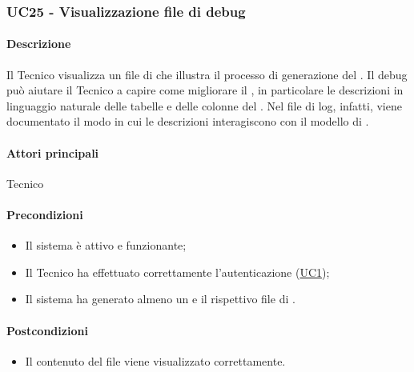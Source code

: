 \subsubsection{UC25 - Visualizzazione file di debug}\label{UC25}
\paragraph*{Descrizione}
Il Tecnico visualizza un file di  che illustra il processo di generazione del . Il debug può aiutare il Tecnico a capire come migliorare il , in particolare le descrizioni in linguaggio naturale delle tabelle e delle colonne del . Nel file di log, infatti, viene documentato il modo in cui le descrizioni interagiscono con il modello di .

\paragraph*{Attori principali}
Tecnico

\paragraph*{Precondizioni}
\begin{itemize}
  \item Il sistema è attivo e funzionante;
  \item Il Tecnico ha effettuato correttamente l'autenticazione (\hyperref[UC1]{UC1});
  \item Il sistema ha generato almeno un  e il rispettivo file di .
\end{itemize}

\paragraph*{Postcondizioni}
\begin{itemize}
  \item Il contenuto del file viene visualizzato correttamente.
\end{itemize}

